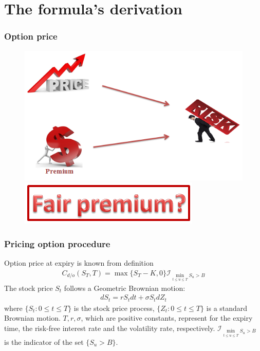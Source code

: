 \documentclass{beamer}
\begin{document}
\section{The formula's derivation}
\begin{frame}
\frametitle{Option price}
\begin{figure}[htp]
	\begin{center}
		\includegraphics[scale=0.6]{fig9}
	\end{center}
\begin{center}
	\includegraphics[scale=0.6]{fig10}
\end{center}
\end{figure}	
\end{frame}
\begin{frame}
\frametitle{Pricing option procedure}
Option price at expiry is known from definition
\begin{align}
	C_{d/o}(S_T, T)=\max\{S_T-K, 0\}\mathcal{I}_{\underset{t\leq u\leq T}\min S_u > B}
\end{align}
The stock price $S_t$ follows a Geometric Brownian motion:
\begin{align*}
 dS_t=rS_tdt+\sigma S_t dZ_t
\end{align*}
where $\{S_t: 0\leq t\leq T\}$ is the stock price process, $\{Z_t: 0\leq t\leq T\}$ is a standard Brownian motion. $T, r, \sigma$, which are positive constants, represent for the expiry time, the risk-free interest rate and the volatility rate, respectively.  $\mathcal{I}_{\underset{t\leq u\leq T}\min S_u > B}$ is the indicator of the set $\{S_u > B\}$.
\end{frame}
\end{document}
